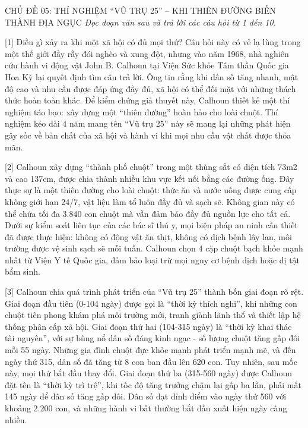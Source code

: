 \documentclass[12pt,a4paper,twoside]{article}
\newenvironment{readingpassage}[1][]{%
    \begin{tcolorbox}[enhanced, colback=grayLight, colframe=secondaryBlue,
        coltitle=textDark, fonttitle=\bfseries, title={#1},
        rounded corners, arc=3mm, boxrule=1pt,
        left=15pt, right=15pt, top=10pt, bottom=10pt,
        breakable, before skip=10pt, after skip=10pt, drop fuzzy shadow]
    \setstretch{1.3}
}{\end{tcolorbox}}
\begin{document}
\newpage
\label{a_cd05}
\begin{topicbox}{\large CHỦ ĐỀ 05: THÍ NGHIỆM ``VŨ TRỤ 25'' -- KHI THIÊN ĐƯỜNG BIẾN THÀNH ĐỊA NGỤC}
\vspace{8pt}
\textit{Đọc đoạn văn sau và trả lời các câu hỏi từ 1 đến 10.}
\vspace{6pt}
\end{topicbox}
\vspace{5pt}
\begin{readingpassage}[]
[1] Điều gì xảy ra khi một xã hội có đủ mọi thứ? Câu hỏi này có vẻ lạ lùng trong một thế giới đầy rẫy đói nghèo và xung đột, nhưng vào năm 1968, nhà nghiên cứu hành vi động vật John B. Calhoun tại Viện Sức khỏe Tâm thần Quốc gia Hoa Kỳ lại quyết định tìm câu trả lời. Ông tin rằng khi dân số tăng nhanh, mật độ cao và nhu cầu được đáp ứng đầy đủ, xã hội có thể đối mặt với những thách thức hoàn toàn khác. Để kiểm chứng giả thuyết này, Calhoun thiết kế một thí nghiệm táo bạo: xây dựng một ``thiên đường'' hoàn hảo cho loài chuột. Thí nghiệm kéo dài 4 năm mang tên ``Vũ trụ 25'' này sẽ mang lại những phát hiện gây sốc về bản chất của xã hội và hành vi khi mọi nhu cầu vật chất được thỏa mãn.

[2] Calhoun xây dựng ``thành phố chuột'' trong một thùng sắt có diện tích 73m2 và cao 137cm, được chia thành nhiều khu vực kết nối bằng các đường ống. Đây thực sự là một thiên đường cho loài chuột: thức ăn và nước uống được cung cấp không giới hạn 24/7, vật liệu làm tổ luôn đầy đủ và sạch sẽ. Không gian này có thể chứa tối đa 3.840 con chuột mà vẫn đảm bảo đầy đủ nguồn lực cho tất cả. Dưới sự kiểm soát liên tục của các bác sĩ thú y, mọi biện pháp an ninh cần thiết đã được thực hiện: không có động vật ăn thịt, không có dịch bệnh lây lan, môi trường được vệ sinh sạch sẽ mỗi tuần. Calhoun chọn 4 cặp chuột bạch khỏe mạnh nhất từ Viện Y tế Quốc gia, đảm bảo loại trừ mọi nguy cơ bệnh dịch hoặc dị tật bẩm sinh.

[3] Calhoun chia quá trình phát triển của ``Vũ trụ 25'' thành bốn giai đoạn rõ rệt. Giai đoạn đầu tiên (0-104 ngày) được gọi là ``thời kỳ thích nghi'', khi những con chuột tiên phong khám phá môi trường mới, tranh giành lãnh thổ và thiết lập hệ thống phân cấp xã hội. Giai đoạn thứ hai (104-315 ngày) là ``thời kỳ khai thác tài nguyên'', với sự bùng nổ dân số đáng kinh ngạc - số lượng chuột tăng gấp đôi mỗi 55 ngày. Những gia đình chuột đực khỏe mạnh phát triển mạnh mẽ, và đến ngày thứ 315, dân số đã tăng từ 8 con ban đầu lên 620 con. Tuy nhiên, sau mốc này, mọi thứ bắt đầu thay đổi. Giai đoạn thứ ba (315-560 ngày) được Calhoun đặt tên là ``thời kỳ trì trệ'', khi tốc độ tăng trưởng chậm lại gấp ba lần, phải mất 145 ngày để dân số tăng gấp đôi. Dân số đạt đỉnh điểm vào ngày thứ 560 với khoảng 2.200 con, và những hành vi bất thường bắt đầu xuất hiện ngày càng nhiều.


\end{readingpassage}
\end{document}
